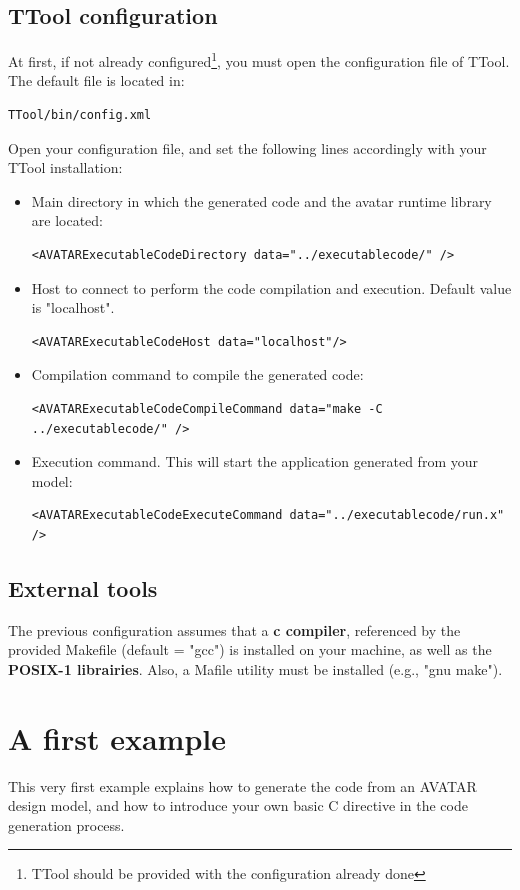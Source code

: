 \documentclass[12pt]{article}
\begin{document}
\subsection{TTool configuration}
At first, if not already configured\footnote{TTool should be provided with the configuration already done}, you must open the configuration file of TTool. The default file is located in:
\begin{verbatim}
TTool/bin/config.xml
\end{verbatim}
Open your configuration file, and set the following lines accordingly with your TTool installation:
\begin{itemize}
\item Main directory in which the generated code and the avatar runtime library are located:
\begin{verbatim}
<AVATARExecutableCodeDirectory data="../executablecode/" />
\end{verbatim}
\item Host to connect to perform the code compilation and execution. Default value is "localhost".
\begin{verbatim}
<AVATARExecutableCodeHost data="localhost"/>
\end{verbatim}
\item Compilation command to compile the generated code:
\begin{verbatim}
<AVATARExecutableCodeCompileCommand data="make -C ../executablecode/" />
\end{verbatim}
\item Execution command. This will start the application generated from your model:
\begin{verbatim}
<AVATARExecutableCodeExecuteCommand data="../executablecode/run.x" />
\end{verbatim}
\end{itemize}

\subsection{External tools}
The previous configuration assumes that a \textbf{c compiler}, referenced by the provided Makefile (default = "gcc") is installed on your machine, as well as the \textbf{POSIX-1 librairies}. Also, a Mafile utility must be installed (e.g., "gnu make").

\newpage
\section{A first example}\label{sec:example}
This very first example explains how to generate the code from an AVATAR design model, and how to introduce your own basic C directive in the code generation process.
\end{document}
